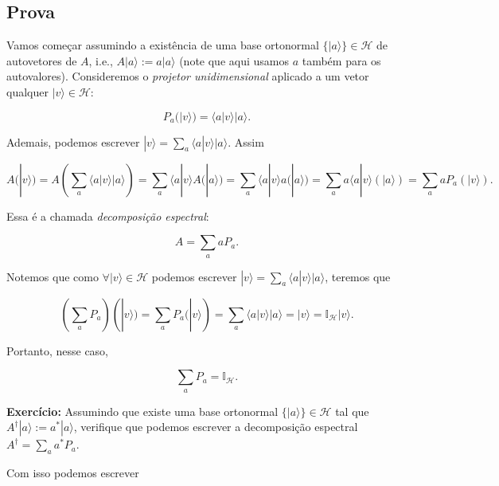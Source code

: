 \documentclass[11pt]{article}
\begin{document}
\subsection{Prova}\label{prova}

Vamos começar assumindo a existência de uma base ortonormal
\(\{|a\rangle\}\in\mathcal{H}\) de autovetores de \(A\), i.e.,
\(A|a\rangle := a|a\rangle\) (note que aqui usamos \(a\) também para os
autovalores). Consideremos o \emph{projetor unidimensional} aplicado a
um vetor qualquer \(|v\rangle\in\mathcal{H}\):

\begin{equation}
P_{a}(|v\rangle)=\langle a|v\rangle |a\rangle.
\end{equation}

Ademais, podemos escrever
\(|v\rangle=\sum_{a}\langle a|v\rangle|a\rangle\). Assim

\begin{equation}
A(|v\rangle) = A(\sum_{a}\langle a|v\rangle|a\rangle) = \sum_{a}\langle a|v\rangle A(|a\rangle) = \sum_{a}\langle a|v\rangle a(|a\rangle) = \sum_{a} a\langle a|v\rangle(|a\rangle) = \sum_{a} aP_{a}(|v\rangle).
\end{equation}

Essa é a chamada \emph{decomposição espectral}:

\begin{equation}
A = \sum_{a} aP_{a}.
\end{equation}

Notemos que como \(\forall|v\rangle\in\mathcal{H}\) podemos escrever
\(|v\rangle=\sum_{a}\langle a|v\rangle|a\rangle\), teremos que

\begin{equation}
(\sum_{a}P_{a})(|v\rangle)=\sum_{a}P_{a}(|v\rangle)=\sum_{a}\langle a|v\rangle|a\rangle =|v\rangle=\mathbb{I}_{\mathcal{H}}|v\rangle.
\end{equation}

Portanto, nesse caso,

\begin{equation}
\sum_{a}P_{a}=\mathbb{I}_{\mathcal{H}}.
\end{equation}

    \textbf{Exercício:} Assumindo que existe uma base ortonormal
\(\{|a\rangle\}\in\mathcal{H}\) tal que
\(A^{\dagger}|a\rangle := a^{*}|a\rangle\), verifique que podemos
escrever a decomposição espectral \(A^{\dagger} = \sum_{a} a^{*}P_{a}\).

Com isso podemos escrever
\end{document}
